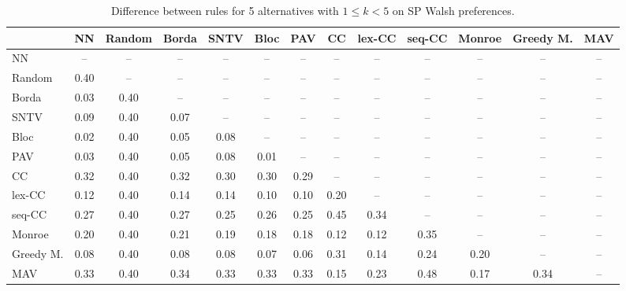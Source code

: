 
\begin{table*}[h!]
\centering
\begin{tabular}{lcccccccccccc}
\toprule
 & NN & Random & Borda & SNTV & Bloc & PAV & CC & lex-CC & seq-CC & Monroe & Greedy M. & MAV \\
\midrule
NN & -- & -- & -- & -- & -- & -- & -- & -- & -- & -- & -- & -- \\
Random & 0.40 & -- & -- & -- & -- & -- & -- & -- & -- & -- & -- & -- \\
Borda & 0.03 & 0.40 & -- & -- & -- & -- & -- & -- & -- & -- & -- & -- \\
SNTV & 0.09 & 0.40 & 0.07 & -- & -- & -- & -- & -- & -- & -- & -- & -- \\
Bloc & 0.02 & 0.40 & 0.05 & 0.08 & -- & -- & -- & -- & -- & -- & -- & -- \\
PAV & 0.03 & 0.40 & 0.05 & 0.08 & 0.01 & -- & -- & -- & -- & -- & -- & -- \\
CC & 0.32 & 0.40 & 0.32 & 0.30 & 0.30 & 0.29 & -- & -- & -- & -- & -- & -- \\
lex-CC & 0.12 & 0.40 & 0.14 & 0.14 & 0.10 & 0.10 & 0.20 & -- & -- & -- & -- & -- \\
seq-CC & 0.27 & 0.40 & 0.27 & 0.25 & 0.26 & 0.25 & 0.45 & 0.34 & -- & -- & -- & -- \\
Monroe & 0.20 & 0.40 & 0.21 & 0.19 & 0.18 & 0.18 & 0.12 & 0.12 & 0.35 & -- & -- & -- \\
Greedy M. & 0.08 & 0.40 & 0.08 & 0.08 & 0.07 & 0.06 & 0.31 & 0.14 & 0.24 & 0.20 & -- & -- \\
MAV & 0.33 & 0.40 & 0.34 & 0.33 & 0.33 & 0.33 & 0.15 & 0.23 & 0.48 & 0.17 & 0.34 & -- \\
\bottomrule
\end{tabular}

\caption{Difference between rules for 5 alternatives with $1 \leq k < 5$ on SP Walsh preferences.}
\end{table*}

